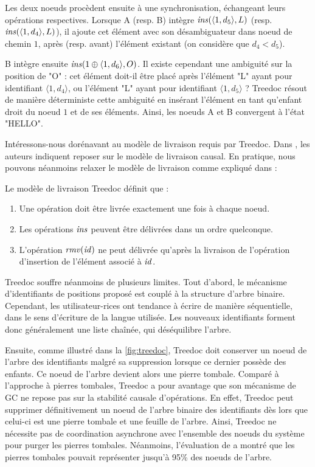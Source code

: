 Les deux noeuds procèdent ensuite à une synchronisation, échangeant leurs opérations respectives.
Lorsque A (resp. B) intègre $\mathit{ins}(\langle 1,d_5 \rangle, L)$ (resp. $\mathit{ins}(\langle 1,d_4 \rangle, L)$), il ajoute cet élément avec son désambiguateur dans noeud de chemin $1$, après (resp. avant) l'élément existant (on considère que $d_4 < d_5$).

B intègre ensuite $\mathit{ins}(1 \oplus \langle 1,d_6 \rangle, O)$.
Il existe cependant une ambiguité sur la position de "O" : cet élément doit-il être placé après l'élément "L" ayant pour identifiant $\langle 1,d_4 \rangle$, ou l'élément "L" ayant pour identifiant $\langle 1,d_5 \rangle$ ?
Treedoc résout de manière déterministe cette ambiguité en insérant l'élément en tant qu'enfant droit du noeud $1$ et de ses éléments.
Ainsi, les noeuds A et B convergent à l'état "HELLO".

Intéressons-nous dorénavant au modèle de livraison requis par Treedoc.
Dans \cite{2009-treedoc-preguica}, les auteurs indiquent reposer sur le modèle de livraison causal.
En pratique, nous pouvons néanmoins relaxer le modèle de livraison comme expliqué dans \cite{2021-these-vic} :
\begin{definition}
  Le modèle de livraison Treedoc définit que :
  \begin{enumerate}[label=(\roman*)]
    \item Une opération doit être livrée exactement une fois à chaque noeud.
    \item Les opérations $\mathit{ins}$ peuvent être délivrées dans un ordre quelconque.
    \item L'opération $\mathit{rmv}(\mathit{id})$ ne peut délivrée qu'après la livraison de l'opération d'insertion de l'élément associé à $\mathit{id}$.
  \end{enumerate}
\end{definition}

Treedoc souffre néanmoins de plusieurs limites.
Tout d'abord, le mécanisme d'identifiants de positions proposé est couplé à la structure d'arbre binaire.
Cependant, les utilisateur-rices ont tendance à écrire de manière séquentielle, \ie dans le sens d'écriture de la langue utilisée.
Les nouveaux identifiants forment donc généralement une liste chaînée, qui déséquilibre l'arbre.

Ensuite, comme illustré dans la \autoref{fig:treedoc}, Treedoc doit conserver un noeud de l'arbre des identifiants malgré sa suppression lorsque ce dernier possède des enfants.
Ce noeud de l'arbre devient alors une pierre tombale.
Comparé à l'approche à pierres tombales, Treedoc a pour avantage que son mécanisme de \ac{GC} ne repose pas sur la stabilité causale d'opérations.
En effet, Treedoc peut supprimer définitivement un noeud de l'arbre binaire des identifiants dès lors que celui-ci est une pierre tombale et une feuille de l'arbre.
Ainsi, Treedoc ne nécessite pas de coordination asynchrone avec l'ensemble des noeuds du système pour purger les pierres tombales.
Néanmoins, l'évaluation de \cite{2009-treedoc-preguica} a montré que les pierres tombales pouvait représenter jusqu'à 95\% des noeuds de l'arbre.

